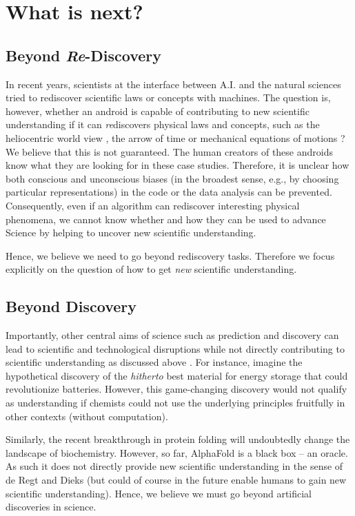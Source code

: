 \section{What is next?}

\subsection{Beyond \textit{Re}-Discovery}
In recent years, scientists at the interface between A.I. and the natural sciences tried to rediscover scientific laws or concepts with machines. The question is, however, whether an android is capable of contributing to new scientific understanding if it can \textit{re}discovers physical laws and concepts, such as the heliocentric world view \cite{iten2020discovering}, the arrow of time \cite{seif2020machine} or mechanical equations of motions \cite{udrescu2020ai}? We believe that this is not guaranteed. The human creators of these androids know what they are looking for in these case studies. Therefore, it is unclear how both conscious and unconscious biases (in the broadest sense, e.g., by choosing particular representations) in the code or the data analysis can be prevented. Consequently, even if an algorithm can rediscover interesting physical phenomena, we cannot know whether and how they can be used to advance Science by helping to uncover new scientific understanding.

Hence, we believe we need to go beyond rediscovery tasks. Therefore we focus explicitly on the question of how to get \textit{new} scientific understanding.

\subsection{Beyond Discovery}
Importantly, other central aims of science such as prediction and discovery can lead to scientific and technological disruptions while not directly contributing to scientific understanding as discussed above \cite{de2020understanding,potochnik2017idealization}. For instance, imagine the hypothetical discovery of the \textit{hitherto} best material for energy storage that could revolutionize batteries. However, this game-changing discovery would not qualify as understanding if chemists could not use the underlying principles fruitfully in other contexts (without computation).

Similarly, the recent breakthrough in protein folding will undoubtedly change the landscape of biochemistry. However, so far, AlphaFold is a black box -- an oracle\cite{jumper2021highly,tunyasuvunakool2021highly}. As such it does not directly provide new scientific understanding in the sense of de Regt and Dieks (but could of course in the future enable humans to gain new scientific understanding). Hence, we believe we must go beyond artificial discoveries in science.

